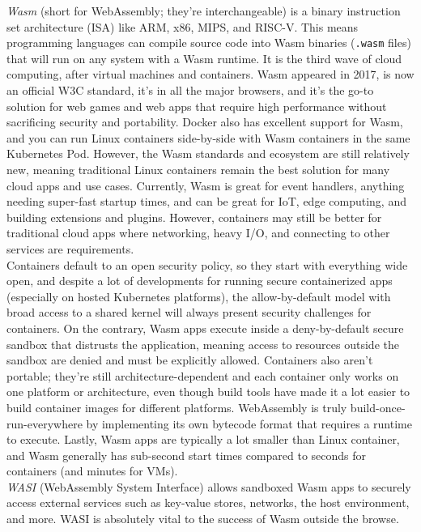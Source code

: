 \documentclass[table, xcdraw]{article}%
\begin{document}
\emph{Wasm} (short for WebAssembly; they're interchangeable) is a binary instruction set architecture (ISA) like ARM, x86, MIPS, and RISC-V. This means programming languages can compile source code into Wasm binaries (\texttt{.wasm} files) that will run on any system with a Wasm runtime. It is the third wave of cloud computing, after virtual machines and containers. Wasm appeared in 2017, is now an official W3C standard, it’s in all the major browsers, and it’s the go-to solution for web games and web apps that require high performance without sacrificing security and portability. Docker also has excellent support for Wasm, and you can run Linux containers side-by-side with Wasm containers in the same Kubernetes Pod. However, the Wasm standards and ecosystem are still relatively new, meaning traditional Linux containers remain the best solution for many cloud apps and use cases. Currently, Wasm is great for event handlers, anything needing super-fast startup times, and can be great for IoT, edge computing, and building extensions and plugins. However, containers may still be better for traditional cloud apps where networking, heavy I/O, and connecting to other services are requirements.\\
Containers default to an open security policy, so they start with everything wide open, and despite a lot of developments for running secure containerized apps (especially on hosted Kubernetes platforms), the allow-by-default model with broad access to a shared kernel will always present security challenges for containers. On the contrary, Wasm apps execute inside a deny-by-default secure sandbox that distrusts the application, meaning access to resources outside the sandbox are denied and must be explicitly allowed. Containers also aren't portable; they're still architecture-dependent and each container only works on one platform or architecture, even though build tools have made it a lot easier to build container images for different platforms. WebAssembly is truly build-once-run-everywhere by implementing its own bytecode format that requires a runtime to execute. Lastly, Wasm apps are typically a lot smaller than Linux container, and Wasm generally has sub-second start times compared to seconds for containers (and minutes for VMs).\\
\emph{WASI} (WebAssembly System Interface) allows sandboxed Wasm apps to securely access external services such as key-value stores, networks, the host environment, and more. WASI is absolutely vital to the success of Wasm outside the browse.
\end{document}

